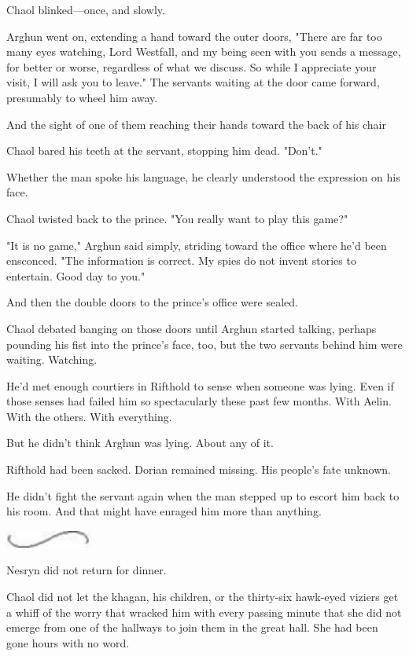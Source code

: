 Chaol blinked---once, and slowly.

Arghun went on, extending a hand toward the outer doors, "There are far too many eyes watching, Lord Westfall, and my being seen with you sends a message, for better or worse, regardless of what we discuss. So while I appreciate your visit, I will ask you to leave." The servants waiting at the door came forward, presumably to wheel him away.

And the sight of one of them reaching their hands toward the back of his chair 

Chaol bared his teeth at the servant, stopping him dead. "Don't."

Whether the man spoke his language, he clearly understood the expression on his face.

Chaol twisted back to the prince. "You really want to play this game?"

"It is no game," Arghun said simply, striding toward the office where he'd been ensconced. "The information is correct. My spies do not invent stories to entertain. Good day to you."

And then the double doors to the prince's office were sealed.

Chaol debated banging on those doors until Arghun started talking, perhaps pounding his fist into the prince's face, too, but  the two servants behind him were waiting. Watching.

He'd met enough courtiers in Rifthold to sense when someone was lying. Even if those senses had failed him so spectacularly these past few months. With Aelin. With the others. With  everything.

But he didn't think Arghun was lying. About any of it.

Rifthold had been sacked. Dorian remained missing. His people's fate unknown.

He didn't fight the servant again when the man stepped up to escort him back to his room. And that might have enraged him more than anything.

\begin{center}
\includegraphics[width=1.12in,height=0.24in]{images/seperator}
\end{center}

Nesryn did not return for dinner.

Chaol did not let the khagan, his children, or the thirty-six hawk-eyed viziers get a whiff of the worry that wracked him with every passing minute that she did not emerge from one of the hallways to join them in the great hall. She had been gone hours with no word.

